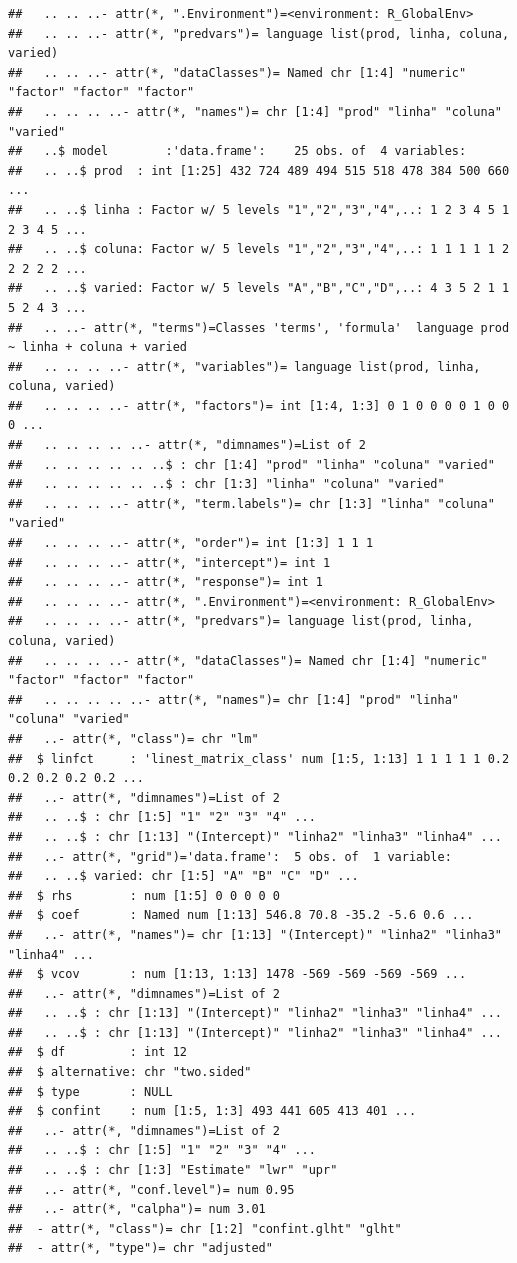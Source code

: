 \documentclass[
]{book}
\begin{document}
\begin{verbatim}
##   .. .. ..- attr(*, ".Environment")=<environment: R_GlobalEnv> 
##   .. .. ..- attr(*, "predvars")= language list(prod, linha, coluna, varied)
##   .. .. ..- attr(*, "dataClasses")= Named chr [1:4] "numeric" "factor" "factor" "factor"
##   .. .. .. ..- attr(*, "names")= chr [1:4] "prod" "linha" "coluna" "varied"
##   ..$ model        :'data.frame':    25 obs. of  4 variables:
##   .. ..$ prod  : int [1:25] 432 724 489 494 515 518 478 384 500 660 ...
##   .. ..$ linha : Factor w/ 5 levels "1","2","3","4",..: 1 2 3 4 5 1 2 3 4 5 ...
##   .. ..$ coluna: Factor w/ 5 levels "1","2","3","4",..: 1 1 1 1 1 2 2 2 2 2 ...
##   .. ..$ varied: Factor w/ 5 levels "A","B","C","D",..: 4 3 5 2 1 1 5 2 4 3 ...
##   .. ..- attr(*, "terms")=Classes 'terms', 'formula'  language prod ~ linha + coluna + varied
##   .. .. .. ..- attr(*, "variables")= language list(prod, linha, coluna, varied)
##   .. .. .. ..- attr(*, "factors")= int [1:4, 1:3] 0 1 0 0 0 0 1 0 0 0 ...
##   .. .. .. .. ..- attr(*, "dimnames")=List of 2
##   .. .. .. .. .. ..$ : chr [1:4] "prod" "linha" "coluna" "varied"
##   .. .. .. .. .. ..$ : chr [1:3] "linha" "coluna" "varied"
##   .. .. .. ..- attr(*, "term.labels")= chr [1:3] "linha" "coluna" "varied"
##   .. .. .. ..- attr(*, "order")= int [1:3] 1 1 1
##   .. .. .. ..- attr(*, "intercept")= int 1
##   .. .. .. ..- attr(*, "response")= int 1
##   .. .. .. ..- attr(*, ".Environment")=<environment: R_GlobalEnv> 
##   .. .. .. ..- attr(*, "predvars")= language list(prod, linha, coluna, varied)
##   .. .. .. ..- attr(*, "dataClasses")= Named chr [1:4] "numeric" "factor" "factor" "factor"
##   .. .. .. .. ..- attr(*, "names")= chr [1:4] "prod" "linha" "coluna" "varied"
##   ..- attr(*, "class")= chr "lm"
##  $ linfct     : 'linest_matrix_class' num [1:5, 1:13] 1 1 1 1 1 0.2 0.2 0.2 0.2 0.2 ...
##   ..- attr(*, "dimnames")=List of 2
##   .. ..$ : chr [1:5] "1" "2" "3" "4" ...
##   .. ..$ : chr [1:13] "(Intercept)" "linha2" "linha3" "linha4" ...
##   ..- attr(*, "grid")='data.frame':  5 obs. of  1 variable:
##   .. ..$ varied: chr [1:5] "A" "B" "C" "D" ...
##  $ rhs        : num [1:5] 0 0 0 0 0
##  $ coef       : Named num [1:13] 546.8 70.8 -35.2 -5.6 0.6 ...
##   ..- attr(*, "names")= chr [1:13] "(Intercept)" "linha2" "linha3" "linha4" ...
##  $ vcov       : num [1:13, 1:13] 1478 -569 -569 -569 -569 ...
##   ..- attr(*, "dimnames")=List of 2
##   .. ..$ : chr [1:13] "(Intercept)" "linha2" "linha3" "linha4" ...
##   .. ..$ : chr [1:13] "(Intercept)" "linha2" "linha3" "linha4" ...
##  $ df         : int 12
##  $ alternative: chr "two.sided"
##  $ type       : NULL
##  $ confint    : num [1:5, 1:3] 493 441 605 413 401 ...
##   ..- attr(*, "dimnames")=List of 2
##   .. ..$ : chr [1:5] "1" "2" "3" "4" ...
##   .. ..$ : chr [1:3] "Estimate" "lwr" "upr"
##   ..- attr(*, "conf.level")= num 0.95
##   ..- attr(*, "calpha")= num 3.01
##  - attr(*, "class")= chr [1:2] "confint.glht" "glht"
##  - attr(*, "type")= chr "adjusted"
\end{verbatim}
\end{document}
